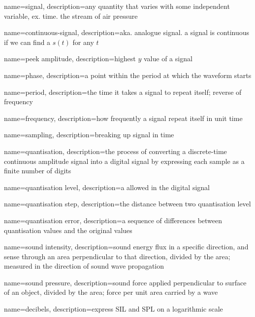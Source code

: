 {
  name=signal,
  description={any quantity that varies with some independent variable, ex. time.
  the stream of air pressure}
}

{
  name=continuous-signal,
  description={aka. analogue signal. a signal is continuous if we can find
  a $ s \left( t \right) $ for any $ t $}
}

{
  name=peek amplitude,
  description={highest $ y $ value of a signal}
}

{
  name=phase,
  description={a point within the period at which the waveform starts}
}

{
  name=period,
  description={the time it takes a signal to repeat itself; reverse of
  frequency}
}

{
  name=frequency,
  description={how frequently a signal repeat itself in unit time}
}

{
  name=sampling,
  description={breaking up signal in time}
}

{
  name=quantisation,
  description={the process of converting a discrete-time continuous amplitude
  signal into a digital signal by expressing each sample as a finite number
  of digits}
}

{
  name=quantisation level,
  description={a allowed in the digital signal}
}

{
  name=quantisation step,
  description={the distance between two quantisation level}
}

{
  name=quantisation error,
  description={a sequence of differences between quantisation values and the
  original values}
}

{
  name=sound intensity,
  description={sound energy flux in a specific direction, and sense through an
  area perpendicular to that direction, divided by the area; measured in
  the direction of sound wave propagation}
}

{
  name=sound pressure,
  description={sound force applied perpendicular to surface of an object,
  divided by the area; force per unit area carried by a wave}
}

{
  name=decibels,
  description={express SIL and SPL on a logarithmic scale}
}

